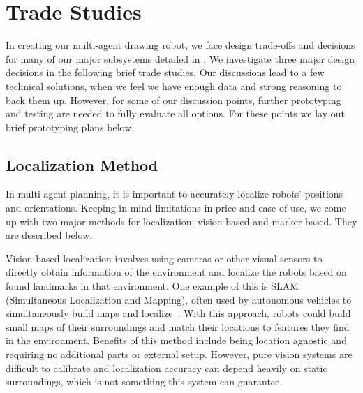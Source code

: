 
\section{Trade Studies}
\label{sec:trade_studies}

In creating our multi-agent drawing robot, we face design trade-offs and decisions for many of our major subsystems detailed in . We investigate three major design decisions in the following brief trade studies. Our discussions lead to a few technical solutions, when we feel we have enough data and strong reasoning to back them up. However, for some of our discussion points, further prototyping and testing are needed to fully evaluate all options. For these points we lay out brief prototyping plans below. 

\subsection{Localization Method}
\label{sec:trade_localization}
In multi-agent planning, it is important to accurately localize robots' positions and orientations. Keeping in mind limitations in price and ease of use, we come up with two major methods for localization: vision based and marker based. They are described below.

Vision-based localization involves using cameras or other visual sensors to directly obtain information of the environment and localize the robots based on found landmarks in that environment. One example of this is SLAM (Simultaneous Localization and Mapping), often used by autonomous vehicles to simultaneously build maps and localize~\cite{dissanayake2001solution}. With this approach, robots could build small maps of their surroundings and match their locations to features they find in the environment. Benefits of this method include being location agnostic and requiring no additional parts or external setup. However, pure vision systems are difficult to calibrate and localization accuracy can depend heavily on static surroundings, which is not something this system can guarantee.


